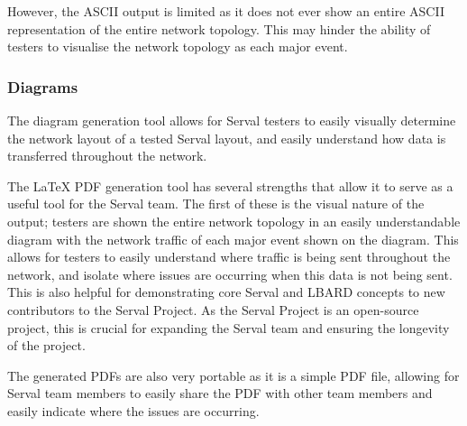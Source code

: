 However, the ASCII output is limited as it does not ever show an entire ASCII representation of the entire network topology.
This may hinder the ability of testers to visualise the network topology as each major event.

\subsubsection{Diagrams}
The diagram generation tool allows for Serval testers to easily visually determine the network layout of a tested Serval layout, and easily understand how data is transferred throughout the network.


The LaTeX PDF generation tool has several strengths that allow it to serve as a useful tool for the Serval team.
The first of these is the visual nature of the output; testers are shown the entire network topology in an easily understandable diagram with the network traffic of each major event shown on the diagram.
This allows for testers to easily understand where traffic is being sent throughout the network, and isolate where issues are occurring when this data is not being sent.
This is also helpful for demonstrating core Serval and LBARD concepts to new contributors to the Serval Project.
As the Serval Project is an open-source project, this is crucial for expanding the Serval team and ensuring the longevity of the project.

The generated PDFs are also very portable as it is a simple PDF file, allowing for Serval team members to easily share the PDF with other team members and easily indicate where the issues are occurring.

